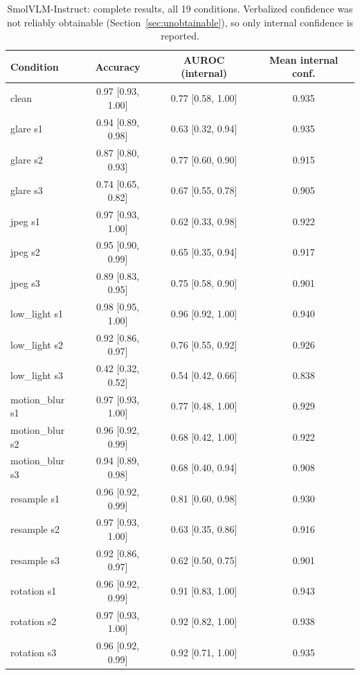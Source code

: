\documentclass[11pt]{article}
\begin{document}
\begin{table}[h]
\centering
\small
\caption{SmolVLM-Instruct: complete results, all 19 conditions. Verbalized
confidence was not reliably obtainable (Section~\ref{sec:unobtainable}), so only
internal confidence is reported.}
\label{tab:appendix-smol}
\begin{tabular}{lccc}
\toprule
Condition & Accuracy & AUROC (internal) & Mean internal conf. \\
\midrule
clean            & 0.97 [0.93, 1.00] & 0.77 [0.58, 1.00] & 0.935 \\
glare s1         & 0.94 [0.89, 0.98] & 0.63 [0.32, 0.94] & 0.935 \\
glare s2         & 0.87 [0.80, 0.93] & 0.77 [0.60, 0.90] & 0.915 \\
glare s3         & 0.74 [0.65, 0.82] & 0.67 [0.55, 0.78] & 0.905 \\
jpeg s1          & 0.97 [0.93, 1.00] & 0.62 [0.33, 0.98] & 0.922 \\
jpeg s2          & 0.95 [0.90, 0.99] & 0.65 [0.35, 0.94] & 0.917 \\
jpeg s3          & 0.89 [0.83, 0.95] & 0.75 [0.58, 0.90] & 0.901 \\
low\_light s1    & 0.98 [0.95, 1.00] & 0.96 [0.92, 1.00] & 0.940 \\
low\_light s2    & 0.92 [0.86, 0.97] & 0.76 [0.55, 0.92] & 0.926 \\
low\_light s3    & 0.42 [0.32, 0.52] & 0.54 [0.42, 0.66] & 0.838 \\
motion\_blur s1  & 0.97 [0.93, 1.00] & 0.77 [0.48, 1.00] & 0.929 \\
motion\_blur s2  & 0.96 [0.92, 0.99] & 0.68 [0.42, 1.00] & 0.922 \\
motion\_blur s3  & 0.94 [0.89, 0.98] & 0.68 [0.40, 0.94] & 0.908 \\
resample s1      & 0.96 [0.92, 0.99] & 0.81 [0.60, 0.98] & 0.930 \\
resample s2      & 0.97 [0.93, 1.00] & 0.63 [0.35, 0.86] & 0.916 \\
resample s3      & 0.92 [0.86, 0.97] & 0.62 [0.50, 0.75] & 0.901 \\
rotation s1      & 0.96 [0.92, 0.99] & 0.91 [0.83, 1.00] & 0.943 \\
rotation s2      & 0.97 [0.93, 1.00] & 0.92 [0.82, 1.00] & 0.938 \\
rotation s3      & 0.96 [0.92, 0.99] & 0.92 [0.71, 1.00] & 0.935 \\
\bottomrule
\end{tabular}
\end{table}
\end{document}
